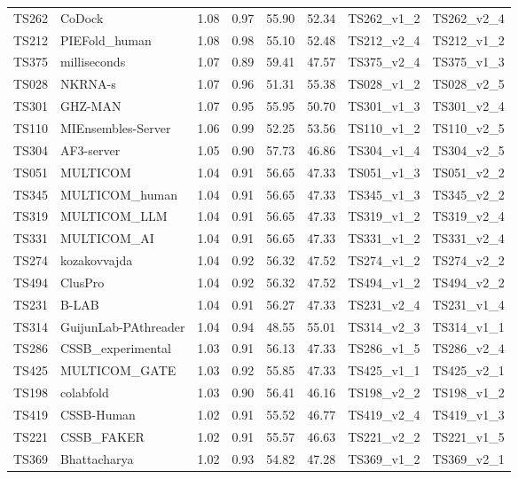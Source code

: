 \begin{longtable}{llllllll}
TS262 & CoDock & 1.08 & 0.97 & 55.90 & 52.34 & TS262\_v1\_2 & TS262\_v2\_4 \\ 
TS212 & PIEFold\_human & 1.08 & 0.98 & 55.10 & 52.48 & TS212\_v2\_4 & TS212\_v1\_2 \\ 
TS375 & milliseconds & 1.07 & 0.89 & 59.41 & 47.57 & TS375\_v2\_4 & TS375\_v1\_3 \\ 
TS028 & NKRNA-s & 1.07 & 0.96 & 51.31 & 55.38 & TS028\_v1\_2 & TS028\_v2\_5 \\ 
TS301 & GHZ-MAN & 1.07 & 0.95 & 55.95 & 50.70 & TS301\_v1\_3 & TS301\_v2\_4 \\ 
TS110 & MIEnsembles-Server & 1.06 & 0.99 & 52.25 & 53.56 & TS110\_v1\_2 & TS110\_v2\_5 \\ 
TS304 & AF3-server & 1.05 & 0.90 & 57.73 & 46.86 & TS304\_v1\_4 & TS304\_v2\_5 \\ 
TS051 & MULTICOM & 1.04 & 0.91 & 56.65 & 47.33 & TS051\_v1\_3 & TS051\_v2\_2 \\ 
TS345 & MULTICOM\_human & 1.04 & 0.91 & 56.65 & 47.33 & TS345\_v1\_3 & TS345\_v2\_2 \\ 
TS319 & MULTICOM\_LLM & 1.04 & 0.91 & 56.65 & 47.33 & TS319\_v1\_2 & TS319\_v2\_4 \\ 
TS331 & MULTICOM\_AI & 1.04 & 0.91 & 56.65 & 47.33 & TS331\_v1\_2 & TS331\_v2\_4 \\ 
TS274 & kozakovvajda & 1.04 & 0.92 & 56.32 & 47.52 & TS274\_v1\_2 & TS274\_v2\_2 \\ 
TS494 & ClusPro & 1.04 & 0.92 & 56.32 & 47.52 & TS494\_v1\_2 & TS494\_v2\_2 \\ 
TS231 & B-LAB & 1.04 & 0.91 & 56.27 & 47.33 & TS231\_v2\_4 & TS231\_v1\_4 \\ 
TS314 & GuijunLab-PAthreader & 1.04 & 0.94 & 48.55 & 55.01 & TS314\_v2\_3 & TS314\_v1\_1 \\ 
TS286 & CSSB\_experimental & 1.03 & 0.91 & 56.13 & 47.33 & TS286\_v1\_5 & TS286\_v2\_4 \\ 
TS425 & MULTICOM\_GATE & 1.03 & 0.92 & 55.85 & 47.33 & TS425\_v1\_1 & TS425\_v2\_1 \\ 
TS198 & colabfold & 1.03 & 0.90 & 56.41 & 46.16 & TS198\_v2\_2 & TS198\_v1\_2 \\ 
TS419 & CSSB-Human & 1.02 & 0.91 & 55.52 & 46.77 & TS419\_v2\_4 & TS419\_v1\_3 \\ 
TS221 & CSSB\_FAKER & 1.02 & 0.91 & 55.57 & 46.63 & TS221\_v2\_2 & TS221\_v1\_5 \\ 
TS369 & Bhattacharya & 1.02 & 0.93 & 54.82 & 47.28 & TS369\_v1\_2 & TS369\_v2\_1 \\ 

\end{longtable}
